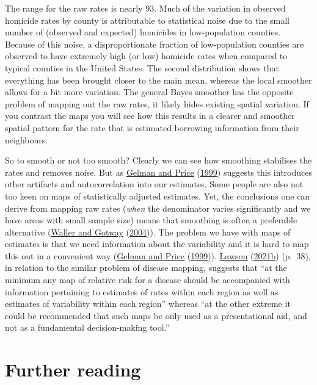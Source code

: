 \documentclass[
]{book}
\begin{document}
The range for the raw rates is nearly 93. Much of the variation in observed homicide rates by county is attributable to statistical noise due to the small number of (observed and expected) homicides in low-population counties. Because of this noise, a disproportionate fraction of low-population counties are observed to have extremely high (or low) homicide rates when compared to typical counties in the United States. The second distribution shows that everything has been brought closer to the main mean, whereas the local smoother allows for a bit more variation. The general Bayes smoother has the opposite problem of mapping out the raw rates, it likely hides existing spatial variation. If you contrast the maps you will see how this results in a clearer and smoother spatial pattern for the rate that is estimated borrowing information from their neighbours.

So to smooth or not too smooth? Clearly we can see how smoothing stabilises the rates and removes noise. But as \protect\hyperlink{ref-Gelman_1999}{Gelman and Price} (\protect\hyperlink{ref-Gelman_1999}{1999}) suggests this introduces other artifacts and autocorrelation into our estimates. Some people are also not too keen on maps of statistically adjusted estimates. Yet, the conclusions one can derive from mapping raw rates (\emph{when} the denominator varies significantly and we have areas with small sample size) means that smoothing is often a preferable alternative (\protect\hyperlink{ref-Waller_2004}{Waller and Gotway} (\protect\hyperlink{ref-Waller_2004}{2004})). The problem we have with maps of estimates is that we need information about the variability and it is hard to map this out in a convenient way (\protect\hyperlink{ref-Gelman_1999}{Gelman and Price} (\protect\hyperlink{ref-Gelman_1999}{1999})). \protect\hyperlink{ref-Lawson_2006}{Lawson} (\protect\hyperlink{ref-Lawson_2006}{2021b}) (p.~38), in relation to the similar problem of disease mapping, suggests that ``at the minimum any map of relative risk for a disease should be accompanied with information pertaining to estimates of rates within each region as well as estimates of variability within each region'' whereas ``at the other extreme it could be recommended that such maps be only used as a presentational aid, and not as a fundamental decision-making tool.''

\hypertarget{further-reading-1}{%
\section{Further reading}\label{further-reading-1}}
\end{document}
